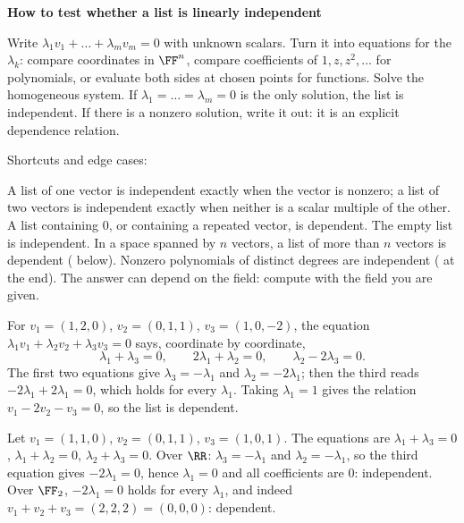 \documentclass[10pt]{scrartcl}
\newenvironment{methodbox}[1]{\begin{mdframed}[style=methodstyle]\textbf{\color{NavyBlue}#1}\par\vspace{2pt}}{\end{mdframed}}
\begin{document}
\begin{methodbox}{How to test whether a list is linearly independent}
  \begin{steps}
    \ii Write $\lambda_1v_1+\dots+\lambda_mv_m=0$ with unknown scalars.
    \ii Turn it into equations for the $\lambda_k$: compare coordinates in $\FF^n$, compare coefficients of $1,z,z^2,\dots$ for polynomials, or evaluate both sides at chosen points for functions.
    \ii Solve the homogeneous system. If $\lambda_1=\dots=\lambda_m=0$ is the only solution, the list is independent. If there is a nonzero solution, write it out: it is an explicit dependence relation.
  \end{steps}
  Shortcuts and edge cases:
  \begin{itemize}
    \ii A list of one vector is independent exactly when the vector is nonzero; a list of two vectors is independent exactly when neither is a scalar multiple of the other.
    \ii A list containing $0$, or containing a repeated vector, is dependent. The empty list is independent.
    \ii In a space spanned by $n$ vectors, a list of more than $n$ vectors is dependent ( below).
    \ii Nonzero polynomials of distinct degrees are independent ( at the end).
    \ii The answer can depend on the field: compute with the field you are given.
  \end{itemize}
\end{methodbox}

\begin{example*}
  For $v_1=(1,2,0)$, $v_2=(0,1,1)$, $v_3=(1,0,-2)$, the equation $\lambda_1v_1+\lambda_2v_2+\lambda_3v_3=0$ says, coordinate by coordinate,
  \[
    \lambda_1+\lambda_3=0,\qquad 2\lambda_1+\lambda_2=0,\qquad \lambda_2-2\lambda_3=0.
  \]
  The first two equations give $\lambda_3=-\lambda_1$ and $\lambda_2=-2\lambda_1$; then the third reads $-2\lambda_1+2\lambda_1=0$, which holds for every $\lambda_1$. Taking $\lambda_1=1$ gives the relation $v_1-2v_2-v_3=0$, so the list is dependent.
\end{example*}

\begin{example*}
  Let $v_1=(1,1,0)$, $v_2=(0,1,1)$, $v_3=(1,0,1)$. The equations are $\lambda_1+\lambda_3=0$, $\lambda_1+\lambda_2=0$, $\lambda_2+\lambda_3=0$. Over $\RR$: $\lambda_3=-\lambda_1$ and $\lambda_2=-\lambda_1$, so the third equation gives $-2\lambda_1=0$, hence $\lambda_1=0$ and all coefficients are $0$: independent. Over $\FF_2$, $-2\lambda_1=0$ holds for every $\lambda_1$, and indeed $v_1+v_2+v_3=(2,2,2)=(0,0,0)$: dependent.
\end{example*}
\end{document}
